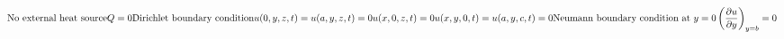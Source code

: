 \documentclass[10pt]{article}
\begin{document}
\[\newline 
\text{No external heat source}\newline\newline
Q =0\newline
\newline
\text{Dirichlet boundary condition} \newline\newline
u(0,y,z,t) =u(a,y,z,t) = 0\newline
u(x,0,z,t) =0\newline
u(x,y,0,t) =u(a,y,c,t) = 0\newline
\newline
\text{Neumann boundary condition at }  y = 0\newline\newline
\left( \frac{\partial u}{\partial y} \right)_{y=b} = 0
\]
\end{document}
